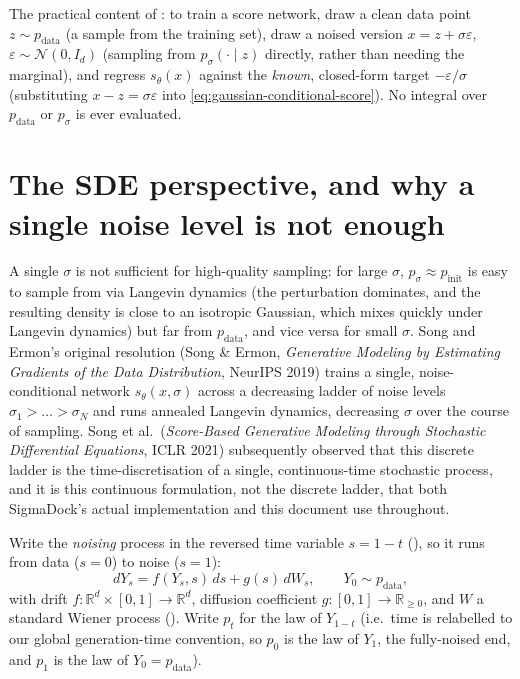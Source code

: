 \documentclass[11pt,a4paper]{report}
\theoremstyle{definition}
\theoremstyle{remark}
\newcommand{\RR}{\mathbb R}
\begin{document}
The practical content of : to train a score
network, draw a clean data point $z\sim p_{\mathrm{data}}$ (a sample from
the training set), draw a noised version
$x = z + \sigma\varepsilon$, $\varepsilon\sim\mathcal N(0,I_d)$
(sampling from $p_\sigma(\cdot\mid z)$ directly, rather than needing the
marginal), and regress $s_\theta(x)$ against the \emph{known}, closed-form
target $-\varepsilon/\sigma$ (substituting $x-z=\sigma\varepsilon$ into
\eqref{eq:gaussian-conditional-score}). No integral over
$p_{\mathrm{data}}$ or $p_\sigma$ is ever evaluated.

\section{The SDE perspective, and why a single noise level is not enough}
\label{sec:sde-perspective}

A single $\sigma$ is not sufficient for high-quality sampling: for large
$\sigma$, $p_\sigma\approx p_{\mathrm{init}}$ is easy to sample from via
Langevin dynamics (the perturbation dominates, and the resulting density is
close to an isotropic Gaussian, which mixes quickly under Langevin
dynamics) but far from $p_{\mathrm{data}}$, and vice versa for small
$\sigma$. Song and Ermon's original resolution
(Song \& Ermon, \emph{Generative Modeling by Estimating Gradients of the
Data Distribution}, NeurIPS 2019) trains a single, noise-conditional network
$s_\theta(x,\sigma)$ across a decreasing ladder of noise levels
$\sigma_1>\dots>\sigma_N$ and runs annealed Langevin dynamics, decreasing
$\sigma$ over the course of sampling. Song et al.\ (\emph{Score-Based
Generative Modeling through Stochastic Differential Equations}, ICLR 2021)
subsequently observed that this discrete ladder is the time-discretisation
of a single, continuous-time stochastic process, and it is this continuous
formulation, not the discrete ladder, that both SigmaDock's actual
implementation and this document use throughout.

Write the \emph{noising} process in the reversed time variable $s=1-t$
(), so it runs from data ($s=0$) to noise
($s=1$):
\begin{equation}
\label{eq:forward-sde-scratch}
dY_s = f(Y_s,s)\,ds + g(s)\,dW_s,
\qquad
Y_0\sim p_{\mathrm{data}} ,
\end{equation}
with drift $f:\RR^d\times[0,1]\to\RR^d$, diffusion coefficient
$g:[0,1]\to\RR_{\ge0}$, and $W$ a standard Wiener process
(). Write $p_t$ for the law of $Y_{1-t}$ (i.e.\ time is
relabelled to our global generation-time convention, so $p_0$ is the law of
$Y_1$, the fully-noised end, and $p_1$ is the law of $Y_0=p_{\mathrm{data}}$).
\end{document}
